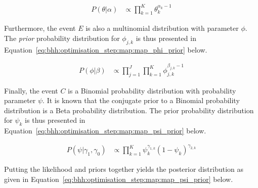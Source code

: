 \begin{equation}
      \label{eq:bhh:optimisation_step:map:map_theta_prior}
      \begin{split}
            P(\theta | \alpha)
            &\propto \prod_{k=1}^{K} \theta_{k}^{\alpha_{k} -1}
      \end{split}
\end{equation}

Furthermore, the event $E$ is also a multinomial distribution with parameter $\phi$. The \textit{prior} probability distribution for $\phi_{j,k}$ is thus presented in Equation~\eqref{eq:bhh:optimisation_step:map:map_phi_prior} below.

\begin{equation}
      \label{eq:bhh:optimisation_step:map:map_phi_prior}
      \begin{split}
            P(\phi \vert \beta)
            &\propto \prod_{j=1}^{J}  \prod_{k=1}^{K} \phi_{j,k}^{\beta_{j,k} -1}
      \end{split}
\end{equation}

Finally, the event $C$ is a Binomial probability distribution with probability parameter $\psi$. It is known that the conjugate prior to a Binomial probability distribution is a Beta probability distribution. The prior probability distribution for $\psi_{k}$ is thus presented in Equation~\eqref{eq:bhh:optimisation_step:map:map_psi_prior} below.

\begin{equation}
      \label{eq:bhh:optimisation_step:map:map_psi_prior}
      \begin{split}
            P(\psi | \gamma_{1}, \gamma_{0})
            &\propto \prod_{k=1}^{K} \psi_{k}^{\gamma_{1,k}} (1- \psi_{k})^{\gamma_{2,k}}
      \end{split}
\end{equation}

Putting the likelihood and priors together yields the posterior distribution as given in Equation~\eqref{eq:bhh:optimisation_step:map:map_psi_prior} below.

